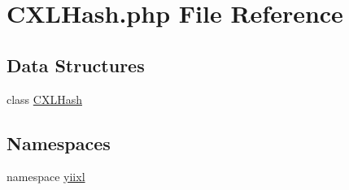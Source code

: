 \hypertarget{CXLHash_8php}{
\section{CXLHash.php File Reference}
\label{CXLHash_8php}
}
\subsection*{Data Structures}
\begin{DoxyCompactItemize}
\item 
class \hyperlink{classCXLHash}{CXLHash}
\end{DoxyCompactItemize}
\subsection*{Namespaces}
\begin{DoxyCompactItemize}
\item 
namespace \hyperlink{namespaceyiixl}{yiixl}
\end{DoxyCompactItemize}

